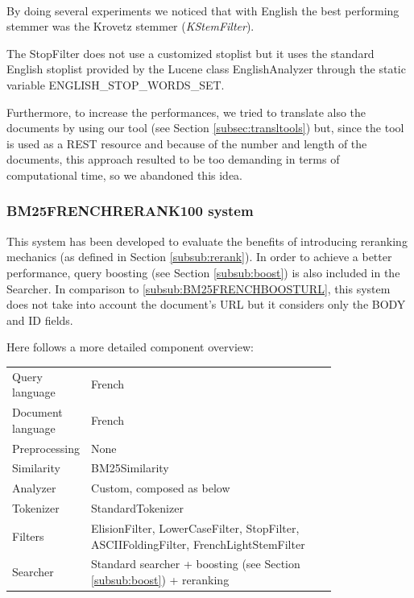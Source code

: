 \\
By doing several experiments we noticed that with English the best performing stemmer was the Krovetz stemmer (\textit{KStemFilter}).
\par
The StopFilter does not use a customized stoplist but it uses the standard English stoplist provided by the Lucene class EnglishAnalyzer through the static variable ENGLISH\_STOP\_WORDS\_SET.
\par
Furthermore, to increase the performances, we tried to translate also the documents by using our tool (see Section \ref{subsec:transltools}) but, since the tool is used as a REST resource and because of the number and length of the documents, this approach resulted to be too demanding in terms of computational time, so we abandoned this idea.

\subsubsection{BM25FRENCHRERANK100 system}
\label{subsub:BM25FRENCHRERANK100}
This system has been developed to evaluate the benefits of introducing reranking mechanics (as defined in Section \ref{subsub:rerank}).
In order to achieve a better performance, query boosting (see Section \ref{subsub:boost}) is also included in the Searcher. In comparison to  \ref{subsub:BM25FRENCHBOOSTURL}, this system does not take into account the document's URL but it considers only the BODY and ID fields.
\par Here follows a more detailed component overview:
\begin{table}[h!]
    \centering
    \begin{tabular}{l p{0.8\linewidth}}
    Query language & French\\
    Document language & French\\
    Preprocessing & None\\
    Similarity & BM25Similarity\\
    Analyzer & Custom, composed as below\\
    Tokenizer & StandardTokenizer\\
    Filters & ElisionFilter, LowerCaseFilter, StopFilter, ASCIIFoldingFilter, FrenchLightStemFilter\\
    Searcher & Standard searcher + boosting (see Section \ref{subsub:boost}) + reranking
    \end{tabular}
\end{table}
